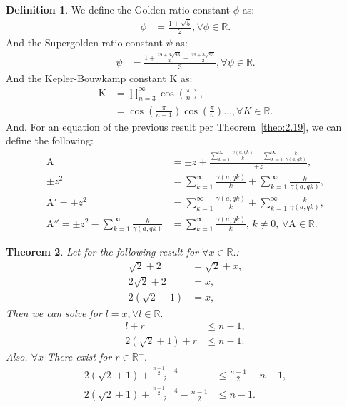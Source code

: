 \documentclass[10pt]{article}
\theoremstyle{plain}
\newtheorem{theorem}{Theorem}[section]
\theoremstyle{definition}
\newtheorem{definition}[theorem]{Definition}
\theoremstyle{remark}
\begin{document}
\begin{definition}
	We define the Golden ratio constant $\phi$ as:
	\begin{align*}
		\phi &= \frac{1+\sqrt{5}}{2}, \forall \phi \in \mathbb{R}.
	\end{align*}
	And the Supergolden-ratio constant $\psi$ as:
	\begin{align*}
		\psi &= \frac{1+\frac{29+3\sqrt{93}}{2}+\frac{29+3\sqrt{93}}{2}}{3}, \forall \psi \in \mathbb{R}.
	\end{align*}
	And the Kepler-Bouwkamp constant $\mathrm{K}$ as:
	\begin{align*}
		\mathrm{K} &= \prod_{n=3}^{\infty} \cos(\frac{\pi}{n}),\\
		&= \cos(\frac{\pi}{n-1}) \cos(\frac{\pi}{n}) \dots, \forall K \in \mathbb{R}.
	\end{align*}
	And. For an equation of the previous result per Theorem~\ref{theo:2.19}, we can define the following:
	\begin{align*}
		\mathrm{A} &= \pm z + \frac{\sum_{k=1}^{\infty} \frac{\gamma(a, qk)}{k} + \sum_{k=1}^{\infty}\frac{k}{\gamma(a, qk)}}{\pm z},\\
		\pm z^2 &= \sum_{k=1}^{\infty} \frac{\gamma(a, qk)}{k} + \sum_{k=1}^{\infty}\frac{k}{\gamma(a, qk)},\\
		\mathrm{A}' = \pm z^2 &= \sum_{k=1}^{\infty} \frac{\gamma(a, qk)}{k} + \sum_{k=1}^{\infty}\frac{k}{\gamma(a, qk)},\\
		\mathrm{A}'' = \pm z^{2} - \sum_{k=1}^{\infty}\frac{k}{\gamma(a, qk)} &= \sum_{k=1}^{\infty} \frac{\gamma(a, qk)}{k}, \, k \neq 0, \, \forall \mathrm{A} \in \mathbb{R}.
	\end{align*}
\end{definition}

\begin{theorem}
	Let for the following result for $\forall x \in \mathbb{R}.$:
	\begin{align*}
		\sqrt{2}+2&=\sqrt{2} + x,\\
		2\sqrt{2}+2 &=x,\\
		2(\sqrt{2} + 1) &= x,
	\end{align*}
	Then we can solve for $l=x, \forall l \in \mathbb{R}.$
	\begin{align*}
		l + r &\leq n - 1,\\
		2(\sqrt{2} + 1) + r &\leq n - 1.
	\end{align*}
	Also. $\forall x$ There exist for $r \in \mathbb{R}^{+}.$
	\begin{align*}
		2(\sqrt{2} + 1) + \frac{\frac{n - 1}{2} - 4}{2}  &\leq \frac{n - 1}{2} + n - 1,\\
		2(\sqrt{2} + 1) + \frac{\frac{n - 1}{2} - 4}{2} - \frac{n - 1}{2} &\leq n - 1.
	\end{align*}
\end{theorem}
\end{document}
